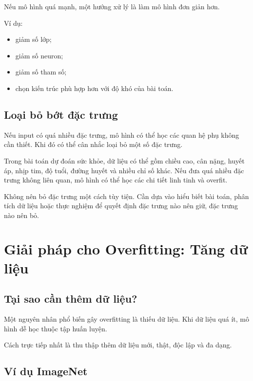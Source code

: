 \documentclass[12pt,a4paper]{report}
\begin{document}
Nếu mô hình quá mạnh, một hướng xử lý là làm mô hình đơn giản hơn.

Ví dụ:

\begin{itemize}
    \item giảm số lớp;
    \item giảm số neuron;
    \item giảm số tham số;
    \item chọn kiến trúc phù hợp hơn với độ khó của bài toán.
\end{itemize}

\section{Loại bỏ bớt đặc trưng}

Nếu input có quá nhiều đặc trưng, mô hình có thể học các quan hệ phụ không cần thiết. Khi đó có thể cân nhắc loại bỏ một số đặc trưng.

\begin{vidu}
Trong bài toán dự đoán sức khỏe, dữ liệu có thể gồm chiều cao, cân nặng, huyết áp, nhịp tim, độ tuổi, đường huyết và nhiều chỉ số khác. Nếu đưa quá nhiều đặc trưng không liên quan, mô hình có thể học các chi tiết linh tinh và overfit.
\end{vidu}

\begin{luuy}
Không nên bỏ đặc trưng một cách tùy tiện. Cần dựa vào hiểu biết bài toán, phân tích dữ liệu hoặc thực nghiệm để quyết định đặc trưng nào nên giữ, đặc trưng nào nên bỏ.
\end{luuy}

\chapter{Giải pháp cho Overfitting: Tăng dữ liệu}

\section{Tại sao cần thêm dữ liệu?}

Một nguyên nhân phổ biến gây overfitting là thiếu dữ liệu. Khi dữ liệu quá ít, mô hình dễ học thuộc tập huấn luyện.

Cách trực tiếp nhất là thu thập thêm dữ liệu mới, thật, độc lập và đa dạng.

\section{Ví dụ ImageNet}
\end{document}
